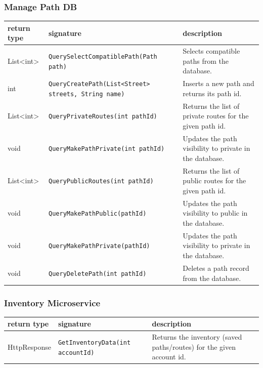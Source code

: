 \subsubsection{Manage Path DB}
\begin{table}[H]
\centering
\small
\begin{tabularx}{\textwidth}{|L{3cm}|L{6.5cm}|Y|}
\hline
\textbf{return type} & \textbf{signature} & \textbf{description} \\
\hline
List<int>& \texttt{QuerySelectCompatiblePath(Path path)} & Selects compatible paths from the database. \\
\hline
int & \texttt{QueryCreatePath(List<Street> streets, String name)} & Inserts a new path and returns its path id. \\
\hline
List<int> & \texttt{QueryPrivateRoutes(int pathId)} & Returns the list of private routes for the given path id. \\
\hline
void & \texttt{QueryMakePathPrivate(int pathId)} & Updates the path visibility to private in the database. \\
\hline
List<int> & \texttt{QueryPublicRoutes(int pathId)} & Returns the list of public routes for the given path id. \\
\hline
void & \texttt{QueryMakePathPublic(pathId)} & Updates the path visibility to public in the database. \\
\hline
void & \texttt{QueryMakePathPrivate(pathId)} & Updates the path visibility to private in the database. \\
\hline
void & \texttt{QueryDeletePath(int pathId)} & Deletes a path record from the database. \\
\hline
\end{tabularx}
\end{table}
\subsubsection{Inventory Microservice}
\begin{table}[H]
\centering
\small
\begin{tabularx}{\textwidth}{|L{3cm}|L{6.5cm}|Y|}
\hline
\textbf{return type} & \textbf{signature} & \textbf{description} \\
\hline
HttpResponse & \texttt{GetInventoryData(int accountId)} & Returns the inventory (saved paths/routes) for the given account id. \\
\hline
\end{tabularx}
\end{table}
\newpage
